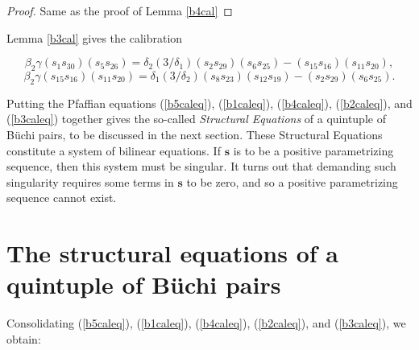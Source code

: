 \documentclass[letterpaper,10pt]{amsart}
\newcommand{\Bs}{{\mathbf{s}}}
\theoremstyle{definition}
\numberwithin{equation}{section}
\begin{document}
\begin{proof} Same as the proof of Lemma \ref{b4cal}
\end{proof}

Lemma \ref{b3cal} gives the calibration

\begin{equation} \label{b3caleq} \beta_2 \gamma (s_1 s_{30})(s_5 s_{26}) = \delta_2(3/\delta_1) (s_2 s_{29})(s_6 s_{25}) - (s_{15} s_{16})(s_{11} s_{20}),\end{equation}
\[\beta_2 \gamma (s_{15} s_{16})(s_{11} s_{20}) = \delta_1(3/\delta_2) (s_8 s_{23})(s_{12} s_{19}) - (s_2 s_{29})(s_6 s_{25}).\] 

Putting the Pfaffian equations (\ref{b5caleq}), (\ref{b1caleq}), (\ref{b4caleq}), (\ref{b2caleq}), and (\ref{b3caleq}) together gives the so-called \emph{Structural Equations} of a quintuple of B\"{u}chi pairs, to be discussed in the next section. These Structural Equations constitute a system of bilinear equations. If $\Bs$ is to be a positive parametrizing sequence, then this system must be singular. It turns out that demanding such singularity requires some terms in $\Bs$ to be zero, and so a positive parametrizing sequence cannot exist. 

\section{The structural equations of a quintuple of B\"{u}chi pairs}
\label{mainquin} 

Consolidating (\ref{b5caleq}), (\ref{b1caleq}), (\ref{b4caleq}), (\ref{b2caleq}), and (\ref{b3caleq}), we obtain:
\end{document}
